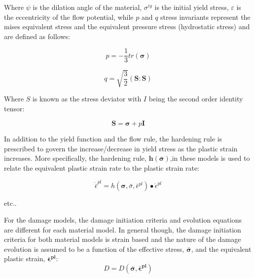 Where $\psi$ is the dilation angle of the material, $\sigma^{iy}$ is the initial yield stress, $\varepsilon$ is the eccentricity of the flow potential, while $p$ and $q$ stress invariants represent the mises equivalent stress and the equivalent pressure stress (hydrostatic stress) and are defined as follows:

\begin{equation}
p=-\frac{1}{3}tr\left(\boldsymbol{\sigma}\right)\label{eqn:druc3}
\end{equation}

\begin{equation}
q=\sqrt{\frac{3}{2}}\left(\mathbf{S}:\mathbf{S}\right)\label{eqn:druc4}
\end{equation}

Where $S$ is known as the stress deviator with $I$ being the second order identity tensor:

\begin{equation}
\mathbf{S}=\boldsymbol{\sigma}+p\mathbf{I}\label{eqn:druc4-1}
\end{equation}

In addition to the yield function and the flow rule, the hardening rule is prescribed to govern the increase/decrease in yield stress as the plastic strain increases. More specifically, the hardening rule, $\mathbf{h}\left(\bar{\boldsymbol{\sigma}}\right)$,in these models is used to relate the equivalent plastic strain rate to the plastic strain rate: 

\begin{equation}
    \dot{\bar{\epsilon}}^{pl} 
    = 
    h
    \left(
        \boldsymbol{\sigma}, \bar{\sigma}, \bar{\epsilon}^{pl}
    \right)
    \bullet \dot{\epsilon}^{pl}
\label{eqn:const8d}
\end{equation}

etc..

For the damage models, the damage initiation criteria and evolution equations are different for each material model. In general though, the damage initiation criteria for both material models is strain based and the nature of the damage evolution is assumed to be a function of the effective stress, $\boldsymbol{\bar{\sigma}}$, and the equivalent plastic strain, $\boldsymbol{\bar{\epsilon}^{pl}}$:
\begin{equation}
D=D(\boldsymbol{\bar{\sigma}},\boldsymbol{\bar{\epsilon}^{pl}})\label{eqn:const8}
\end{equation}




